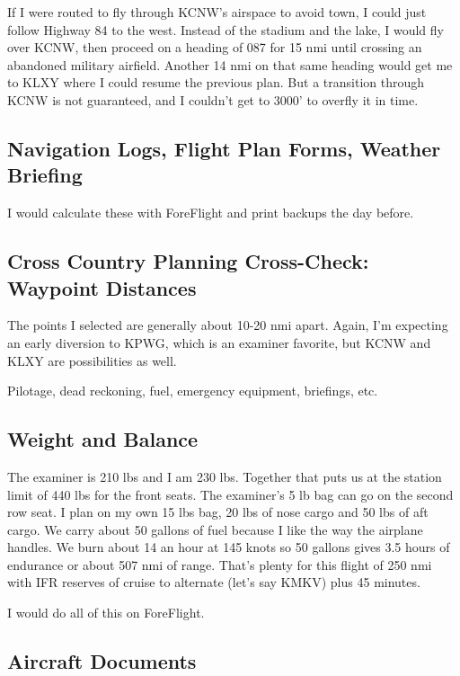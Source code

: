 If I were routed to fly through KCNW's airspace to avoid town, I could just follow Highway 84 to the west. Instead of the stadium and the lake, I would fly over KCNW, then proceed on a heading of 087 for 15 nmi until crossing an abandoned military airfield. Another 14 nmi on that same heading would get me to KLXY where I could resume the previous plan. But a transition through KCNW is not guaranteed, and I couldn't get to 3000' to overfly it in time.

\subsection{Navigation Logs, Flight Plan Forms, Weather Briefing}

I would calculate these with ForeFlight and print backups the day before.

\subsection{Cross Country Planning Cross-Check: Waypoint Distances}

The points I selected are generally about 10-20 nmi apart. Again, I'm expecting an early diversion to KPWG, which is an examiner favorite, but KCNW and KLXY are possibilities as well.

Pilotage, dead reckoning, fuel, emergency equipment, briefings, etc.

\subsection{Weight and Balance}

The examiner is 210 lbs and I am 230 lbs. Together that puts us at the station limit of 440 lbs for the front seats. The examiner's 5 lb bag can go on the second row seat. I plan on my own 15 lbs bag, 20 lbs of nose cargo and 50 lbs of aft cargo. We carry about 50 gallons of fuel because I like the way the airplane handles. We burn about 14 an hour at 145 knots so 50 gallons gives 3.5 hours of endurance or about 507 nmi of range. That's plenty for this flight of 250 nmi with IFR reserves of cruise to alternate (let's say KMKV) plus 45 minutes.

I would do all of this on ForeFlight.

\subsection{Aircraft Documents}

